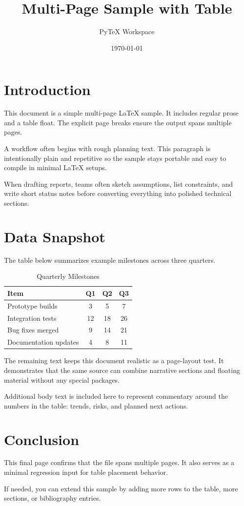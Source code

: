 \documentclass[12pt]{article}
\title{Multi-Page Sample with Table}
\author{PyTeX Workspace}
\date{\today}
\begin{document}
\maketitle

\section*{Introduction}
This document is a simple multi-page LaTeX sample.
It includes regular prose and a table float.
The explicit page breaks ensure the output spans multiple pages.

A workflow often begins with rough planning text.
This paragraph is intentionally plain and repetitive so the sample stays
portable and easy to compile in minimal LaTeX setups.

When drafting reports, teams often sketch assumptions, list constraints,
and write short status notes before converting everything into polished
technical sections.

\newpage

\section*{Data Snapshot}
The table below summarizes example milestones across three quarters.

\begin{table}[htbp]
\centering
\caption{Quarterly Milestones}
\begin{tabular}{|l|c|c|c|}
\hline
Item & Q1 & Q2 & Q3 \\
\hline
Prototype builds & 3 & 5 & 7 \\
Integration tests & 12 & 18 & 26 \\
Bug fixes merged & 9 & 14 & 21 \\
Documentation updates & 4 & 8 & 11 \\
\hline
\end{tabular}
\end{table}

The remaining text keeps this document realistic as a page-layout test.
It demonstrates that the same source can combine narrative sections and
floating material without any special packages.

Additional body text is included here to represent commentary around the
numbers in the table: trends, risks, and planned next actions.

\newpage

\section*{Conclusion}
This final page confirms that the file spans multiple pages.
It also serves as a minimal regression input for table placement behavior.

If needed, you can extend this sample by adding more rows to the table,
more sections, or bibliography entries.
\end{document}
